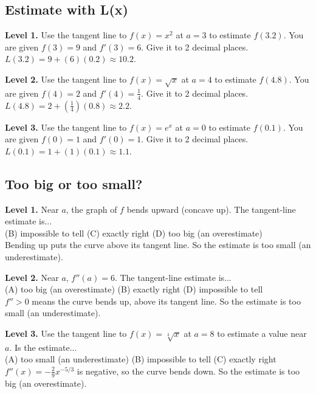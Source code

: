 \documentclass[11pt]{article}
\begin{document}
\subsection*{Estimate with L(x)}
\noindent\textbf{Level 1.} Use the tangent line to $f(x)=x^2$ at $a=3$ to estimate $f(3.2)$. You are given $f(3)=9$ and $f'(3)=6$. Give it to 2 decimal places.\\  \quad $L(3.2)=9+(6)(0.2)\approx10.2$.\par\medskip
\noindent\textbf{Level 2.} Use the tangent line to $f(x)=\sqrt{x}$ at $a=4$ to estimate $f(4.8)$. You are given $f(4)=2$ and $f'(4)=\tfrac{1}{4}$. Give it to 2 decimal places.\\  \quad $L(4.8)=2+(\tfrac{1}{4})(0.8)\approx2.2$.\par\medskip
\noindent\textbf{Level 3.} Use the tangent line to $f(x)=e^x$ at $a=0$ to estimate $f(0.1)$. You are given $f(0)=1$ and $f'(0)=1$. Give it to 2 decimal places.\\  \quad $L(0.1)=1+(1)(0.1)\approx1.1$.\par\medskip
\subsection*{Too big or too small?}
\noindent\textbf{Level 1.} Near $a$, the graph of $f$ bends upward (concave up). The tangent-line estimate is...\\  \quad (B) impossible to tell \quad (C) exactly right \quad (D) too big (an overestimate)\\  \quad Bending up puts the curve above its tangent line. So the estimate is too small (an underestimate).\par\medskip
\noindent\textbf{Level 2.} Near $a$, $f''(a)=6$. The tangent-line estimate is...\\ (A) too big (an overestimate) \quad (B) exactly right \quad {} \quad (D) impossible to tell\\  \quad $f''>0$ means the curve bends up, above its tangent line. So the estimate is too small (an underestimate).\par\medskip
\noindent\textbf{Level 3.} Use the tangent line to $f(x)=\sqrt[3]{x}$ at $a=8$ to estimate a value near $a$.  Is the estimate...\\ (A) too small (an underestimate) \quad (B) impossible to tell \quad (C) exactly right \quad {}\\  \quad $f''(x)=-\tfrac29x^{-5/3}$ is negative, so the curve bends down. So the estimate is too big (an overestimate).\par\medskip
\end{document}
